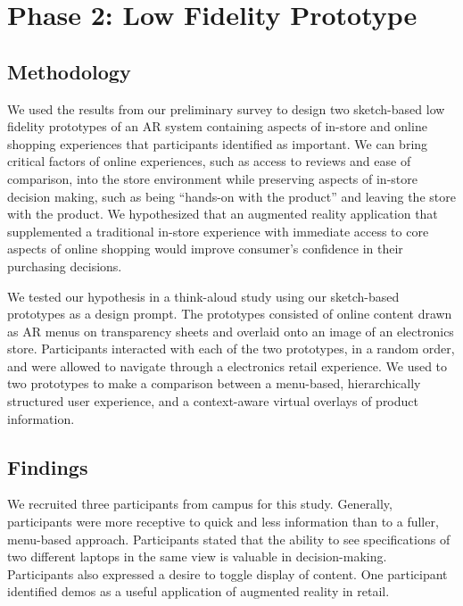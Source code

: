 \section{Phase 2: Low Fidelity Prototype}
\subsection{Methodology}
We used the results from our preliminary survey to design two sketch-based low fidelity prototypes of an AR system containing aspects of in-store and online shopping experiences that participants identified as important.  We can bring critical factors of online experiences, such as access to reviews and ease of comparison, into the store environment while preserving aspects of in-store decision making, such as being ``hands-on with the product'' and leaving the store with the product. We hypothesized that an augmented reality application that supplemented a traditional in-store experience with immediate access to core aspects of online shopping would improve consumer's confidence in their purchasing decisions. 

We tested our hypothesis in a think-aloud study using our sketch-based prototypes as a design prompt.  The prototypes consisted of online content drawn as AR menus on transparency sheets and overlaid onto an image of an electronics store. Participants interacted with each of the two prototypes, in a random order, and were allowed to navigate through a electronics retail experience. We used to two prototypes to make a comparison between a menu-based, hierarchically structured user experience, and a context-aware virtual overlays of product information.  

\subsection{Findings}
We recruited three participants from campus for this study. Generally, participants were more receptive to quick and less information than to a fuller, menu-based approach. Participants stated that the ability to see specifications of two different laptops in the same view is valuable in decision-making. Participants also expressed a desire to toggle display of content. One participant identified demos as a useful application of augmented reality in retail.
